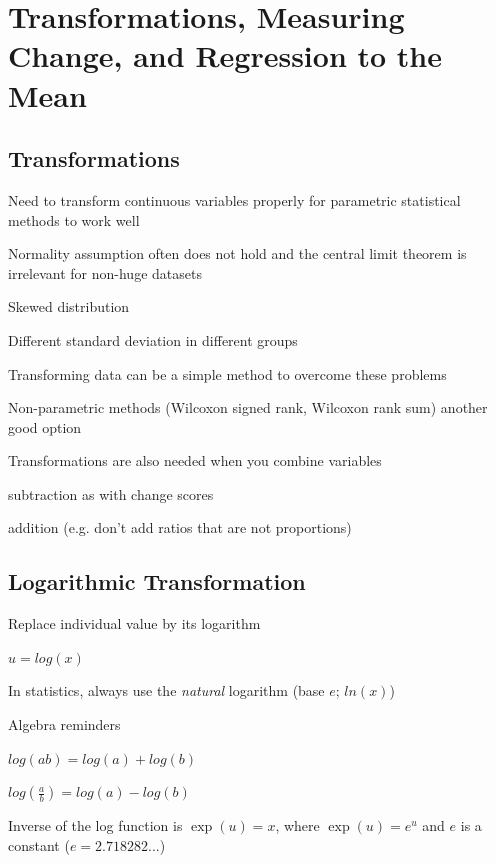 

\chapter{Transformations, Measuring Change, and Regression to the Mean}

\section{Transformations} 

\bi
 \item Need to transform continuous variables properly for parametric
   statistical methods to work well
 \item Normality assumption often does not hold and the central limit
   theorem is irrelevant for non-huge datasets
 \bi
  \item Skewed distribution
  \item Different standard deviation in different groups
 \ei
 \item Transforming data can be a simple method to overcome these problems
 \item Non-parametric methods (Wilcoxon signed rank, Wilcoxon rank sum) another good option
 \item Transformations are also needed when you combine variables
   \bi
   \item subtraction as with change scores
   \item addition (e.g. don't add ratios that are not proportions)
   \ei
\ei


\section{Logarithmic Transformation}  

\bi
\item Replace individual value by its logarithm
  \bi
   \item $u = log(x)$
  \ei
\item In statistics, always use the \textit{natural} logarithm (base $e$; $ln(x)$)
\item Algebra reminders
  \bi
  \item $log(ab) = log(a) + log(b)$
  \item $log\left(\frac{a}{b}\right) = log(a) - log(b)$
  \item Inverse of the log function is $\exp(u) = x$, where $\exp(u) = e^{u}$ and $e$ is a constant ($e = 2.718282 ...$)
  \ei
\ei

